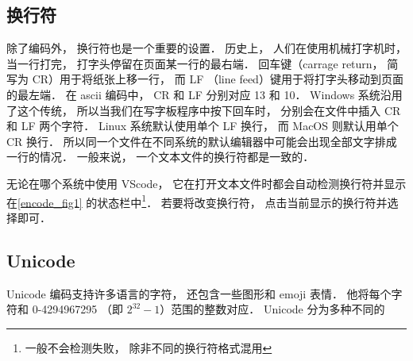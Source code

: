 \subsection{换行符}
除了编码外， 换行符也是一个重要的设置． 历史上， 人们在使用机械打字机时， 当一行打完， 打字头停留在页面某一行的最右端． 回车键（carrage return， 简写为 CR）用于将纸张上移一行， 而 LF （line feed）键用于将打字头移动到页面的最左端． 在 ascii 编码中， CR 和 LF 分别对应 13 和 10． Windows 系统沿用了这个传统， 所以当我们在写字板程序中按下回车时， 分别会在文件中插入 CR 和 LF 两个字符． Linux 系统默认使用单个 LF 换行， 而 MacOS 则默认用单个 CR 换行． 所以同一个文件在不同系统的默认编辑器中可能会出现全部文字排成一行的情况． 一般来说， 一个文本文件的换行符都是一致的．

无论在哪个系统中使用 VScode， 它在打开文本文件时都会自动检测换行符并显示在\autoref{encode_fig1} 的状态栏中\footnote{一般不会检测失败， 除非不同的换行符格式混用}． 若要将改变换行符， 点击当前显示的换行符并选择即可．

\subsection{Unicode}
Unicode 编码支持许多语言的字符， 还包含一些图形和 emoji 表情． 他将每个字符和 0-4294967295 （即 $2^{32}-1$）范围的整数对应． Unicode 分为多种不同的
